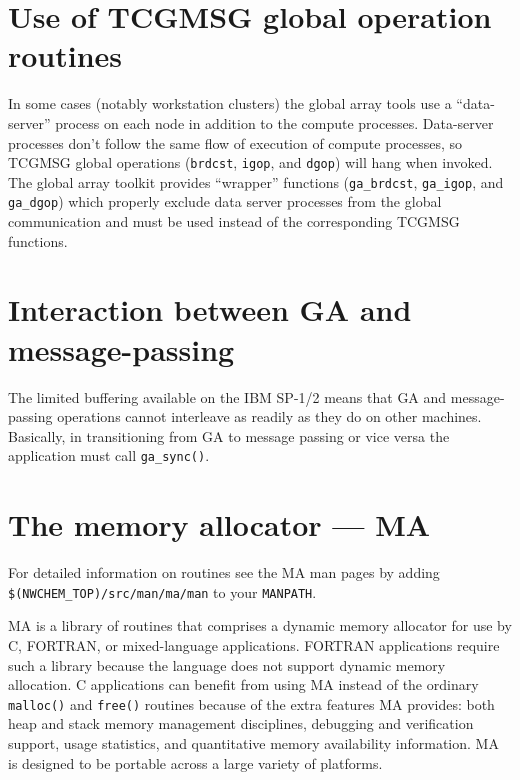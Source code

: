 
\section{Use of TCGMSG global operation routines}

In some cases (notably workstation clusters) the global array tools
use a ``data-server'' process on each node in addition to the compute
processes.  Data-server processes don't follow the same flow of
execution of compute processes, so TCGMSG global operations
(\verb+brdcst+, \verb+igop+, and \verb+dgop+) will hang when invoked.
The global array toolkit provides ``wrapper'' functions
(\verb+ga_brdcst+, \verb+ga_igop+, and \verb+ga_dgop+) which properly
exclude data server processes from the global communication and must
be used instead of the corresponding TCGMSG functions.

\section{Interaction between GA and message-passing}

The limited buffering available on the IBM SP-1/2 means that GA and
message-passing operations cannot interleave as readily as they do on
other machines.  Basically, in transitioning from GA to message
passing or vice versa the application must call {\tt ga\_sync()}.

\section{The memory allocator --- MA}

\sloppy
For detailed information on routines see the MA man pages by adding
{\tt \$(NWCHEM\_TOP)/src/man/ma/man} %
to your {\tt MANPATH}.

\fussy

MA is a library of routines that comprises a dynamic memory allocator
for use by C, FORTRAN, or mixed-language applications.  FORTRAN
applications require such a library because the language does not
support dynamic memory allocation.  C applications can benefit from
using MA instead of the ordinary {\tt malloc()} and {\tt free()}
routines because of the extra features MA provides: both heap and
stack memory management disciplines, debugging and verification
support, usage statistics, and quantitative memory availability
information.  MA is designed to be portable across a large variety of
platforms.

